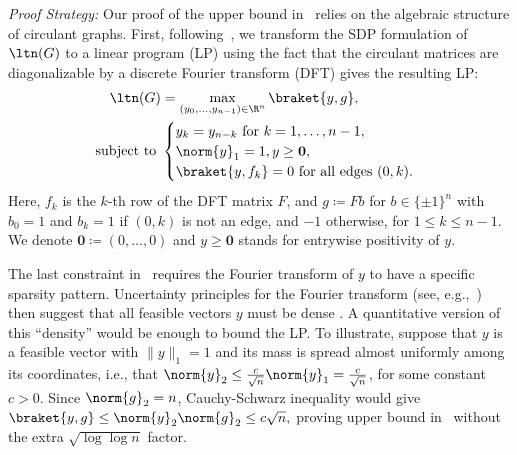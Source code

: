 \noindent
\emph{Proof Strategy:}
Our proof of the upper bound in~ relies on the algebraic structure of circulant graphs. First, following~\cite{magsino2019linear}, we transform the SDP formulation of \(\ltn(G)\) to a linear program (LP) using the fact that the circulant matrices are diagonalizable by a discrete Fourier transform (DFT)
 gives the resulting LP:
\begin{equation}
\label{eq:first_step}
\begin{aligned}
    \ltn(G) &= \max_{(y_0, \dots, y_{n-1}) \in \R^{n}} \braket{y, g}, \\ \text{ subject to }
    &\begin{cases} y_k = y_{n - k} \text{ for } k = 1,\ldots, n - 1, \\
    \norm{y}_1 = 1,
    y \geq \mathbf{0}, \\
    \braket{y, f_k} = 0\text{ for all edges } (0, k).
    \end{cases}
\end{aligned}
\end{equation}
Here, \(f_k\) is the \(k\)-th row of the DFT matrix \(F\), and \(g \coloneqq Fb\) for \(b \in \{\pm 1\}^{n}\) with $b_0=1$ and \(b_k = 1\) if \((0, k)\) is not an edge, and \(-1\) otherwise, for $1 \le k \le n-1$. We denote \(\mathbf{0} \coloneqq (0, \ldots, 0)\) and \(y \geq \mathbf{0}\) stands for entrywise positivity of \(y\).

The last constraint in~ requires the Fourier transform of \(y\) to have a specific sparsity pattern. Uncertainty principles for the Fourier transform (see, e.g.,~\cite{bandeira2018discrete}) then suggest that all feasible vectors \(y\) must be dense \cite{demanet2014scaling}.
A quantitative version of this ``density'' would be enough to bound the LP.
To illustrate, suppose that $y$ is a feasible vector with $\|y\|_1 = 1$ and its mass is spread almost uniformly among its coordinates, i.e., that
\(\norm{y}_2 \leq \frac{c}{\sqrt{n}} \norm{y}_1 = \frac{c}{\sqrt{n}}\), for some constant \(c > 0\). Since \(\norm{g}_2 = n\), Cauchy-Schwarz inequality would give \(\braket{y, g} \leq \norm{y}_2 \norm{g}_2 \leq c\sqrt{n},\) proving upper bound in~ without the extra \(\sqrt{\log \log n}\) factor.

